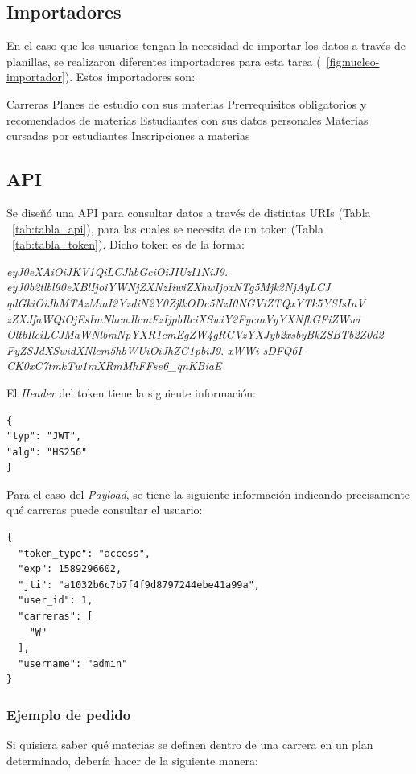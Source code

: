 \subsection{Importadores}

En el caso que los usuarios tengan la necesidad de importar los datos a través de planillas, se realizaron diferentes importadores para esta tarea (~\ref{fig:nucleo-importador}).
Estos importadores son:
\begin{outline}
\2 Carreras
\2 Planes de estudio con sus materias
\2 Prerrequisitos obligatorios y recomendados de materias
\2 Estudiantes con sus datos personales
\2 Materias cursadas por estudiantes
\2 Inscripciones a materias
\end{outline}

\subsection{API}

Se diseñó una API para consultar datos a través de distintas URIs (Tabla ~\ref{tab:tabla_api}), para las cuales se necesita de un token (Tabla ~\ref{tab:tabla_token}).
Dicho token es de la forma:

\textit{eyJ0eXAiOiJKV1QiLCJhbGciOiJIUzI1NiJ9.} \break 
\textit{eyJ0b2tlbl90eXBlIjoiYWNjZXNzIiwiZXhwIjoxNTg5Mjk2NjAyLCJ}\break 
\textit{qdGkiOiJhMTAzMmI2YzdiN2Y0ZjlkODc5NzI0NGViZTQxYTk5YSIsInV}\break 
\textit{zZXJfaWQiOjEsImNhcnJlcmFzIjpbIlciXSwiY2FycmVyYXNfbGFiZWwi} \break \textit{OltbIlciLCJMaWNlbmNpYXR1cmEgZW4gRGVzYXJyb2xsbyBkZSBTb2Z0d2}\break 
\textit{FyZSJdXSwidXNlcm5hbWUiOiJhZG1pbiJ9}.\break 
\textit{xWWi-sDFQ6I-CK0xC7tmkTw1mXRmMhFFse6\_qnKBiaE}


El \textit{Header} del token tiene la siguiente información:
\begin{verbatim}
{
"typ": "JWT",
"alg": "HS256"
}
\end{verbatim}

Para el caso del \textit{Payload}, se tiene la siguiente información indicando precisamente qué carreras puede consultar el usuario:
\begin{verbatim}
{
  "token_type": "access",
  "exp": 1589296602,
  "jti": "a1032b6c7b7f4f9d8797244ebe41a99a",
  "user_id": 1,
  "carreras": [
    "W"
  ],
  "username": "admin"
}
\end{verbatim}

\subsubsection{Ejemplo de pedido}
Si quisiera saber qué materias se definen dentro de una carrera en un plan determinado, debería hacer de la siguiente manera:

